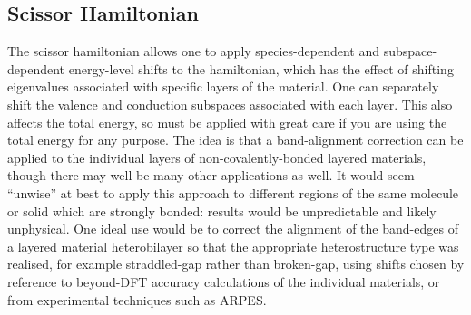 \documentclass[letterpaper,10pt,english]{sphinxmanual}
\begin{document}
\subsection{Scissor Hamiltonian}
\label{\detokenize{scissor_operator:scissor-hamiltonian}}
The scissor hamiltonian allows one to apply species-dependent and
subspace-dependent energy-level shifts to the hamiltonian, which has the
effect of shifting eigenvalues associated with specific layers of the
material. One can separately shift the valence and conduction subspaces
associated with each layer. This also affects the total energy, so must
be applied with great care if you are using the total energy for any
purpose. The idea is that a band-alignment correction can be applied to
the individual layers of non-covalently-bonded layered materials, though
there may well be many other applications as well. It would seem
“unwise” at best to apply this approach to different regions of the same
molecule or solid which are strongly bonded: results would be
unpredictable and likely unphysical. One ideal use would be to correct
the alignment of the band-edges of a layered material heterobilayer so
that the appropriate heterostructure type was realised, for example
straddled-gap rather than broken-gap, using shifts chosen by reference
to beyond-DFT accuracy calculations of the individual materials, or from
experimental techniques such as ARPES.
\end{document}
